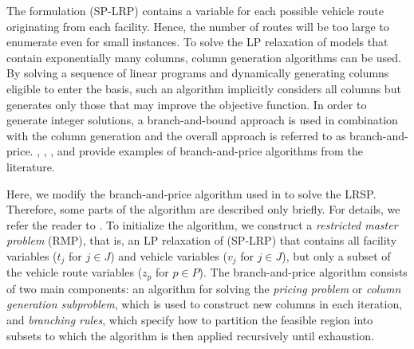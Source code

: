 The formulation (SP-LRP) contains a variable for each possible vehicle
route originating from each facility. Hence, the number of routes will
be too large to enumerate even for small instances. To solve the LP
relaxation of models that contain exponentially many columns, column
generation algorithms can be used. By solving a sequence of linear
programs and dynamically generating columns eligible to enter the
basis, such an algorithm implicitly considers all columns but generates
only those that may improve the objective function. In order to
generate integer solutions, a branch-and-bound approach is used in
combination with the column generation and the overall approach is
referred to as branch-and-price. \citet{Desrochers2}, \citet{Vance2},
\citet{Berger07}, and \citet{Akca} provide examples of
branch-and-price algorithms from the literature.

Here, we modify the branch-and-price algorithm used in \citet{Akca} to
solve the LRSP. Therefore, some parts of the algorithm are described
only briefly. For details, we refer the reader to \citet{Akca}. To
initialize the algorithm, we construct a \emph{restricted master
problem} (RMP), that is, an LP relaxation of (SP-LRP) that contains
all facility variables ($t_j$ for $j \in J$) and vehicle variables
($v_j$ for $j \in J$), but only a subset of the vehicle route
variables ($z_p$ for $p \in P$). The branch-and-price
algorithm consists of two main components: an algorithm for
solving the \emph{pricing problem} or \emph{column generation
subproblem}, which is used to construct new columns in each iteration,
and \emph{branching rules}, which specify how to partition the
feasible region into subsets to which the algorithm is then applied
recursively until exhaustion.

